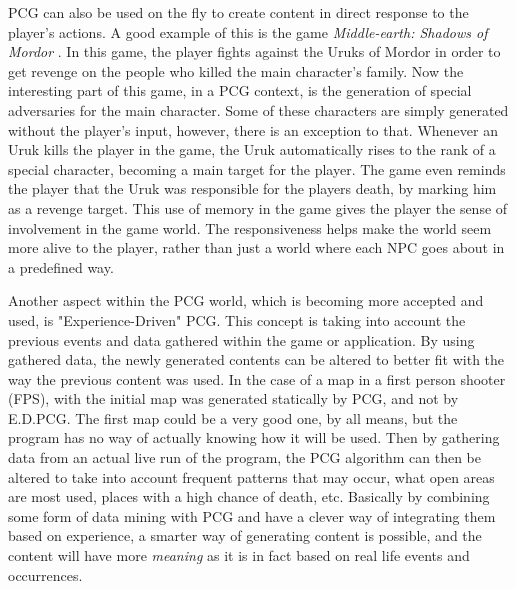 PCG can also be used on the fly to create content in direct response to the player's actions. A good example of this is the game \textit{Middle-earth: Shadows of Mordor} \cite{game:shadowMordor}. In this game, the player fights against the Uruks of Mordor in order to get revenge on the people who killed the main character's family. 
Now the interesting part of this game, in a PCG context, is the generation of special adversaries for the main character. Some of these characters are simply generated without the player's input, however, there is an exception to that. Whenever an Uruk kills the player in the game, the Uruk automatically rises to the rank of a special character, becoming a main target for the player. The game even reminds the player that the Uruk was responsible for the players death, by marking him as a revenge target.
This use of memory in the game gives the player the sense of involvement in the game world. The responsiveness helps make the world seem more alive to the player, rather than just a world where each NPC goes about in a predefined way.

Another aspect within the PCG world, which is becoming more accepted and used, is "Experience-Driven" PCG\cite{art:edpcg}. This concept is taking into account the previous events and data gathered within the game or application. By using gathered data, the newly generated contents can be altered to better fit with the way the previous content was used. In the case of a map in a first person shooter (FPS), with the initial map was generated statically by PCG, and not by E.D.PCG. The first map could be a very good one, by all means, but the program has no way of actually knowing how it will be used. Then by gathering data from an actual live run of the program, the PCG algorithm can then be altered to take into account frequent patterns that may occur, what open areas are most used, places with a high chance of death, etc. Basically by combining some form of data mining with PCG and have a clever way of integrating them based on experience, a smarter way of generating content is possible, and the content will have more \textit{meaning} as it is in fact based on real life events and occurrences.

